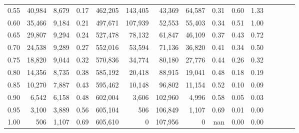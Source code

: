 \begin{tabular}{rrrcrrrrrrrrrrr}
0.55 &  40,984 &  8,679 &                                       0.17 &  462,205 &  143,405 &   43,369 &   64,587 &  0.31 &  0.60 &                         1.33 \\
0.60 &  35,466 &  9,184 &                                       0.21 &  497,671 &  107,939 &   52,553 &   55,403 &  0.34 &  0.51 &                         1.00 \\
0.65 &  29,807 &  9,294 &                                       0.24 &  527,478 &   78,132 &   61,847 &   46,109 &  0.37 &  0.43 &                         0.72 \\
0.70 &  24,538 &  9,289 &                                       0.27 &  552,016 &   53,594 &   71,136 &   36,820 &  0.41 &  0.34 &                         0.50 \\
0.75 &  18,820 &  9,044 &                                       0.32 &  570,836 &   34,774 &   80,180 &   27,776 &  0.44 &  0.26 &                         0.32 \\
0.80 &  14,356 &  8,735 &                                       0.38 &  585,192 &   20,418 &   88,915 &   19,041 &  0.48 &  0.18 &                         0.19 \\
0.85 &  10,270 &  7,887 &                                       0.43 &  595,462 &   10,148 &   96,802 &   11,154 &  0.52 &  0.10 &                         0.09 \\
0.90 &   6,542 &  6,158 &                                       0.48 &  602,004 &    3,606 &  102,960 &    4,996 &  0.58 &  0.05 &                         0.03 \\
0.95 &   3,100 &  3,889 &                                       0.56 &  605,104 &      506 &  106,849 &    1,107 &  0.69 &  0.01 &                         0.00 \\
1.00 &     506 &  1,107 &                                       0.69 &  605,610 &        0 &  107,956 &        0 &   nan &  0.00 &                         0.00 \\
\bottomrule
\end{tabular}
